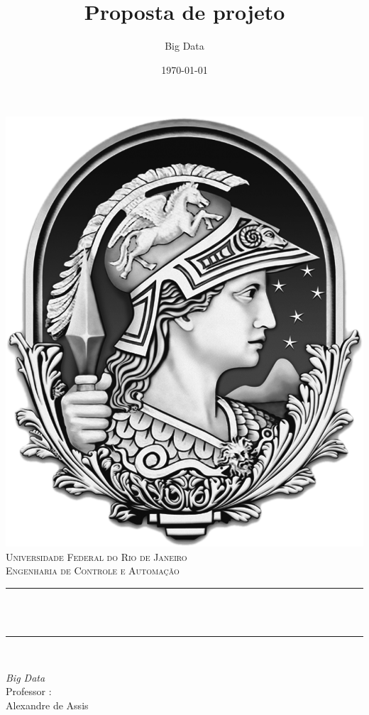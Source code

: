 \documentclass[numbers,a4paper,12pt]{article}
\title{Proposta de projeto}	%
\author{Big Data}			%
\date{\today}				%
\makeatletter
\let\thetitle\@title
\makeatother
\begin{document}

\begin{titlepage}
	\centering
    \vspace*{0.5 cm}
    \includegraphics[scale = 0.3]{logo.jpg}\\[1.0 cm]	%
    \textsc{\LARGE Universidade Federal do Rio de Janeiro\newline\newline}\\[2.0 cm]	%
	\textsc{ Engenharia de Controle e Automação}\\[0.5 cm]				%
	\rule{\linewidth}{0.2 mm} \\[0.4 cm]
	{ \huge \bfseries \thetitle}\\
	\rule{\linewidth}{0.2 mm} \\[1.5 cm]
	
	\begin{minipage}{0.4\textwidth}
		\begin{flushleft} \large
			\emph{Big Data}\\
			Professor : \\Alexandre de Assis\\
			\end{flushleft}
			\end{minipage}~
			\begin{minipage}{0.4\textwidth}
            

\end{minipage}
\end{titlepage}
\end{document}
